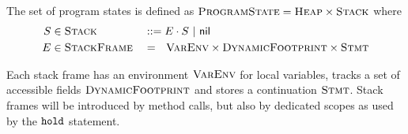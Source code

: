 The set of program states is defined as $\textup{\textsc{ProgramState}} = \textup{\textsc{Heap}} \times \textup{\textsc{Stack}}$ where
\begin{align*}
	S & \in \textup{\textsc{Stack}}      &  & ::= E \cdot S ~|~ \textup{\textmd{\textsf{nil}}}                               \\
	E & \in \textup{\textsc{StackFrame}} &  & =~~ \textup{\textsc{VarEnv}} \times \textup{\textsc{DynamicFootprint}} \times \textup{\textsc{Stmt}}
\end{align*}

Each stack frame has an environment $\textup{\textsc{VarEnv}}$ for local variables, tracks a set of accessible fields $\textup{\textsc{DynamicFootprint}}$ and stores a continuation $\textup{\textsc{Stmt}}$.
Stack frames will be introduced by method calls, but also by dedicated scopes as used by the $\textup{\texttt{hold}}$ statement.

\begin{comment}
REQUIRED?
\begin{definition}[Topmost Stack Entry]
    Let $\topmost : \setStack \rightharpoonup \setStackEntry$ be defined as
    \begin{align*}
    &\topmost(E \cdot S) = E\\
    &\topmost(\nil) \quad\textit{ undefined}
    \end{align*}
\end{definition}

Program states with scheduled statement $s$ are defined as
\begin{displaymath}
\setProgramState_s ~\defeq~ \setHeap ~\times~ \{~~ (\rho, A_d, s) \cdot S ~~|~~ \rho \in \setVarEnv,~ A_d \in \setDFootprint,~ S \in \setStack ~~\}
\end{displaymath}
\end{comment}